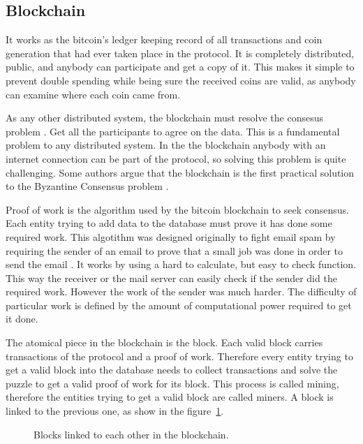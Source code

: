 \subsection{Blockchain} \label{subsec:Blockchain}
It works as the bitcoin's ledger keeping record of all transactions and coin
  generation that had ever taken place in the protocol.
It is completely distributed, public, and anybody can participate and get a
  copy of it.
This makes it simple to prevent double spending while being sure the received
  coins are valid, as anybody can examine where each coin came from.

As any other distributed system, the blockchain must resolve the consesus
  problem \cite{fischer1983consensus}. Get all the participants to agree on
  the data. This is a fundamental problem to any distributed system. In the
  the blockchain anybody with an internet connection can be part of the
  protocol, so solving this problem is quite challenging. Some authors argue
  that the blockchain is the first practical solution to the Byzantine Consensus
  problem \cite{miller2014anonymous,sun2014solving}.

Proof of work is the algorithm used by the bitcoin blockchain to seek
  consensus. Each entity trying to add data to the database must prove it
  has done some required work. This algotithm was designed originally to fight
  email spam by requiring the sender of an email to prove that a small job was
  done in order to send the email \cite{dwork1992pricing}.
It works by using a hard to calculate, but easy to check function. This
  way the receiver or the mail server can easily check if the sender did
  the required work.
However the work of the sender was much harder.
The difficulty of particular work is defined by the amount of computational
  power required to get it done.

The atomical piece in the blockchain is the block. Each valid block carries
  transactions of the protocol and a proof of work. Therefore every entity
  trying to get a valid block into the database needs to collect transactions
  and solve the puzzle to get a valid proof of work for its block.
This process is called mining, therefore the entities trying to get a valid
  block are called miners. A block is linked to the previous one, as show in the
  figure~\ref{fig:block_links}.

\begin{figure}
	\centering
	\def\svgwidth{\columnwidth}
	
	\caption{Blocks linked to each other in the blockchain.}
	\label{fig:block_links}
\end{figure}

